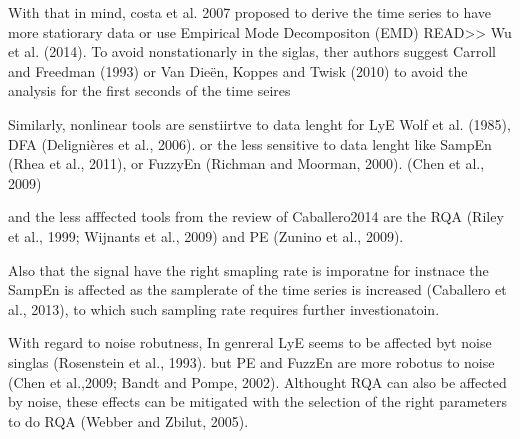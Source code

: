 With that in mind, costa et al. 2007
proposed to derive the time series to have more statiorary data
or use Empirical Mode Decompositon (EMD) READ>> Wu et al. (2014).
To avoid nonstationarly in the siglas, ther authors suggest 
Carroll and Freedman (1993) or Van Dieën, Koppes and Twisk
(2010) to avoid the analysis for the first seconds of the time seires

%




Similarly, nonlinear tools are senstiirtve to data lenght
for LyE Wolf et al. (1985), DFA (Delignières et al., 2006).
or the less sensitive to data lenght like 
SampEn
(Rhea et al., 2011),
or FuzzyEn
(Richman and
Moorman, 2000).
(Chen et al., 2009)


and the less afffected tools from the review of Caballero2014
are the RQA 
(Riley et al., 1999; Wijnants et al., 2009)
and PE
(Zunino et al., 2009).


Also that the signal have the right smapling rate is imporatne
for instnace the SampEn is affected as the samplerate of the time series
is increased (Caballero et al., 2013),
to which such sampling rate requires further investionatoin.


With regard to noise robutness,
In genreral LyE seems to be affected byt noise singlas
(Rosenstein et al., 1993).
but PE and FuzzEn are more robotus to noise 
(Chen et al.,2009; Bandt and Pompe, 2002). 
Althought  RQA can also be affected by noise, these effects can be 
mitigated with the selection of the right parameters to do RQA
(Webber and Zbilut, 2005).













